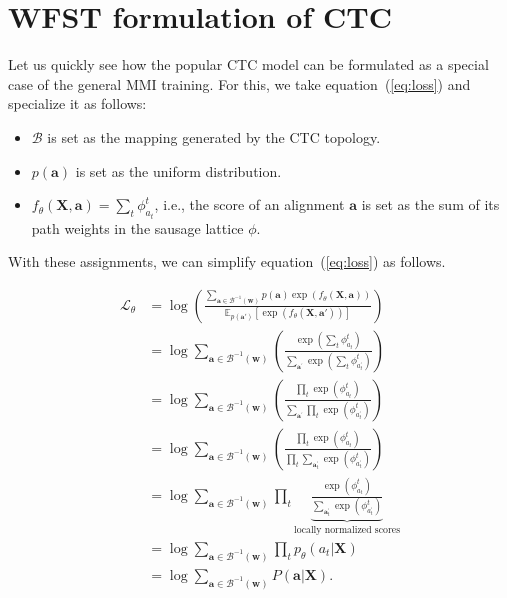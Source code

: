 \section{WFST formulation of CTC}
\label{sec:ctc}
Let us quickly see how the popular CTC model can be formulated as a special case of the general MMI training. For this, we take equation~(\ref{eq:loss}) and specialize it as follows:

\begin{itemize}
    \item $\mathcal{B}$ is set as the mapping generated by the CTC topology.
    \item $p(\mathbf{a})$ is set as the uniform distribution.
    \item $f_{\theta}(\mathbf{X},\mathbf{a}) = \sum_t \phi_{a_t}^t$, i.e., the score of an alignment $\mathbf{a}$ is set as the sum of its path weights in the sausage lattice $\phi$.
\end{itemize}

With these assignments, we can simplify equation~(\ref{eq:loss}) as follows.

\begin{align}
\mathcal{L}_{\theta} &= \log \left( \frac{\sum_{\mathbf{a}\in \mathcal{B}^{-1}(\mathbf{w})} p(\mathbf{a})\exp(f_{\theta}(\mathbf{X},\mathbf{a}))}{\mathbb{E}_{p(\mathbf{a'})}[\exp(f_{\theta}(\mathbf{X},\mathbf{a'}))]} \right) \\
&= \log \sum_{\mathbf{a}\in \mathcal{B}^{-1}(\mathbf{w})} \left( \frac{ \exp(\sum_t \phi_{a_t}^t)}{\sum_{\mathbf{a}^{\prime}} \exp(\sum_t \phi_{a_t^{\prime}}^t)} \right) \\
&= \log \sum_{\mathbf{a}\in \mathcal{B}^{-1}(\mathbf{w})} \left( \frac{\prod_t \exp(\phi_{a_t}^t)}{\sum_{\mathbf{a}^{\prime}} \prod_t \exp(\phi_{a_t^{\prime}}^t)} \right) \\
&= \log \sum_{\mathbf{a}\in \mathcal{B}^{-1}(\mathbf{w})} \left( \frac{\prod_t \exp(\phi_{a_t}^t)}{\prod_t \sum_{\mathbf{a}^{\prime}_t} \exp(\phi_{a_t^{\prime}}^t)} \right) \label{eq:trick} \\
&= \log \sum_{\mathbf{a}\in \mathcal{B}^{-1}(\mathbf{w})} \prod_t \underbrace{\frac{\exp(\phi_{a_t}^t)}{\sum_{\mathbf{a}_t^{\prime}}\exp(\phi_{a_t^{\prime}}^t)}}_{\text{locally normalized scores}} \\
&= \log \sum_{\mathbf{a}\in \mathcal{B}^{-1}(\mathbf{w})} \prod_t p_{\theta}(a_t|\mathbf{X}) \\
&= \log \sum_{\mathbf{a}\in \mathcal{B}^{-1}(\mathbf{w})} P(\mathbf{a}|\mathbf{X}).
\end{align}

